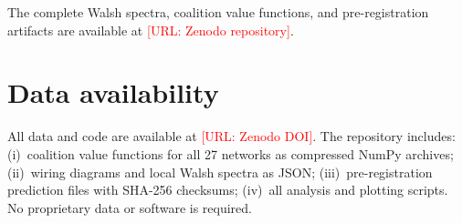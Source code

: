 \documentclass[10pt]{article}
\begin{document}
The complete Walsh spectra, coalition value functions, and
pre-registration artifacts are available at
\textcolor{red}{[URL: Zenodo repository]}.


\section*{Data availability}

All data and code are available at \textcolor{red}{[URL: Zenodo DOI]}.
The repository includes: (i)~coalition value functions for all 27
networks as compressed NumPy archives; (ii)~wiring diagrams and local
Walsh spectra as JSON; (iii)~pre-registration prediction files with
SHA-256 checksums; (iv)~all analysis and plotting scripts.
No proprietary data or software is required.





\end{document}
